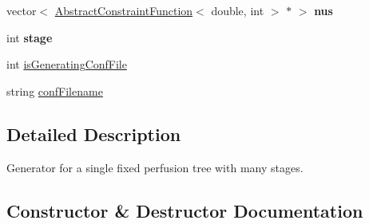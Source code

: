 \begin{DoxyCompactItemize}
\item 
vector$<$ \hyperlink{class_abstract_constraint_function}{Abstract\+Constraint\+Function}$<$ double, int $>$ $\ast$ $>$ {\bfseries nus}\hypertarget{class_staged_f_r_r_s_tree_generator_a8c5c7c43ff7483da4f2076debbf95217}{}\label{class_staged_f_r_r_s_tree_generator_a8c5c7c43ff7483da4f2076debbf95217}

\item 
int {\bfseries stage}\hypertarget{class_staged_f_r_r_s_tree_generator_a18fa6a223b79f35d001274c5fc9f8934}{}\label{class_staged_f_r_r_s_tree_generator_a18fa6a223b79f35d001274c5fc9f8934}

\item 
int \hyperlink{class_staged_f_r_r_s_tree_generator_ae6ab29d9d31103363d0f46e163f9e0cd}{is\+Generating\+Conf\+File}
\item 
string \hyperlink{class_staged_f_r_r_s_tree_generator_a051e558bc25271921834c40ff399a66b}{conf\+Filename}
\end{DoxyCompactItemize}


\subsection{Detailed Description}
Generator for a single fixed perfusion tree with many stages. 

\subsection{Constructor \& Destructor Documentation}
